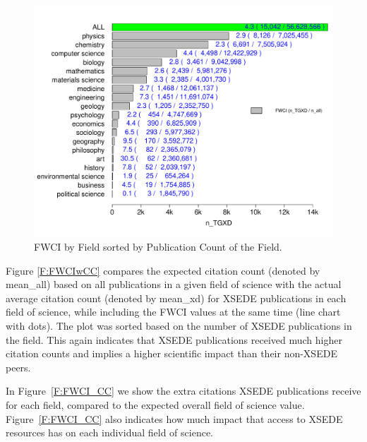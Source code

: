 \documentclass[sigconf]{acmart}
\begin{document}
\begin{figure}[htb!]
  \centering
    \includegraphics[width=0.95\columnwidth]{images/fwci_nxd.pdf}
    \caption{FWCI by Field sorted by Publication Count of the Field.}
    \label{F:fwci_nxd}
\end{figure}

Figure \ref{F:FWCIwCC} compares the expected citation count (denoted by mean\_all) based on
all publications in a given field of science with the actual average
citation count (denoted by mean\_xd) for XSEDE publications in each field of science, while
including the FWCI values at the same time (line chart with dots). The plot was sorted based
on the number of XSEDE publications in the field. This
again indicates that XSEDE publications received much higher citation
counts and implies a higher scientific impact than their non-XSEDE
peers.

In Figure~\ref{F:FWCI_CC} we show the extra citations XSEDE
publications receive for each field, compared to the expected overall
field of science value. Figure~\ref{F:FWCI_CC} also indicates how much
impact that access to XSEDE resources has on each individual field of
science.
\end{document}
